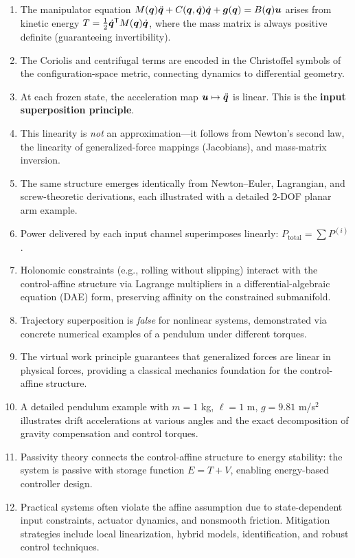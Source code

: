 \begin{enumerate}
\item The manipulator equation $M(\bm{q})\ddot{\bm{q}} + C(\bm{q},\dot{\bm{q}})\dot{\bm{q}} + \bm{g}(\bm{q}) = B(\bm{q})\bm{u}$
      arises from kinetic energy $T = \frac{1}{2}\dot{\bm{q}}^{\mathsf{T}} M(\bm{q})\dot{\bm{q}}$, where the mass matrix
      is always positive definite (guaranteeing invertibility).

\item The Coriolis and centrifugal terms are encoded in the Christoffel symbols of the
      configuration-space metric, connecting dynamics to differential geometry.

\item At each frozen state, the acceleration map $\bm{u}\mapsto\ddot{\bm{q}}$ is linear. This is the
      \textbf{input superposition principle}.

\item This linearity is \emph{not} an approximation---it follows from Newton's second law,
      the linearity of generalized-force mappings (Jacobians), and mass-matrix inversion.

\item The same structure emerges identically from Newton--Euler, Lagrangian, and
      screw-theoretic derivations, each illustrated with a detailed 2-DOF planar arm example.

\item Power delivered by each input channel superimposes linearly: $P_{\text{total}} = \sum P^{(i)}$.

\item Holonomic constraints (e.g., rolling without slipping) interact with the control-affine
      structure via Lagrange multipliers in a differential-algebraic equation (DAE) form,
      preserving affinity on the constrained submanifold.

\item Trajectory superposition is \emph{false} for nonlinear systems, demonstrated via concrete
      numerical examples of a pendulum under different torques.

\item The virtual work principle guarantees that generalized forces are linear in physical forces,
      providing a classical mechanics foundation for the control-affine structure.

\item A detailed pendulum example with $m=1$ kg, $\ell=1$ m, $g=9.81$ m/s$^2$ illustrates
      drift accelerations at various angles and the exact decomposition of gravity compensation
      and control torques.

\item Passivity theory connects the control-affine structure to energy stability: the system
      is passive with storage function $E = T + V$, enabling energy-based controller design.

\item Practical systems often violate the affine assumption due to state-dependent input
      constraints, actuator dynamics, and nonsmooth friction. Mitigation strategies include
      local linearization, hybrid models, identification, and robust control techniques.
\end{enumerate}

